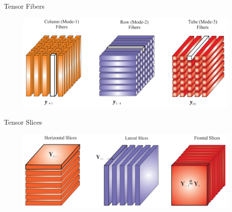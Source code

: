 \documentclass[t, 10pt, handout, aspectratio=169]{beamer}
\begin{document}
\begin{frame}{Tensor Fibers}
\begin{figure}
	\centering  
	\includegraphics[width=\linewidth]{figs/tensor_fibers}
	\label{fig:tensor_fibers}
\end{figure}
\end{frame}

\begin{frame}{Tensor Slices}
\begin{figure}
	\centering  
	\includegraphics[width=\linewidth]{figs/tensor_slices}
	\label{fig:tensor_slices}
\end{figure}
\end{frame}
\end{document}
